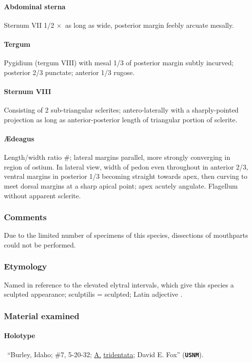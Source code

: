 \documentclass[fleqn,10pt,lineno]{wlpeerj} %
\newcommand{\x}{$\times$~}
\begin{document}
			\paragraph{Abdominal sterna}
				Sternum VII 1/2 \x as long as wide, posterior margin feebly arcuate mesally.
			\paragraph{Tergum}
				Pygidium (tergum VIII) with mesal 1/3 of posterior margin subtly incurved; posterior 2/3 punctate; anterior 1/3 rugose.
			\paragraph{Sternum VIII}
				Consisting of 2 sub-triangular sclerites; antero-laterally with a sharply-pointed projection as long as anterior-posterior length of triangular portion of sclerite.
			\paragraph{{\AE}deagus}
				Length/width ratio \#; lateral margins parallel, more strongly converging in region of ostium. 
				In lateral view, width of pedon even throughout in anterior 2/3, ventral margins in posterior 1/3 becoming straight towards apex, then curving to meet dorsal margins at a sharp apical point; apex acutely angulate. 
				Flagellum without apparent sclerite.
		\subsubsection*{Comments}
			Due to the limited number of specimens of this species, dissections of mouthparts could not be performed.
		\subsubsection*{Etymology}
			Named in reference to the elevated elytral intervals, which give this species a sculpted appearance; sculptilis = sculpted; Latin adjective \citep{brown1956}.
		\subsubsection*{Material examined}
			\paragraph{Holotype}
				\female~``Burley, Idaho; \#7, 5-20-32; \underline{A.} \underline{tridentata}; David E. Fox'' (\texttt{\textbf{USNM}}).
\end{document}
